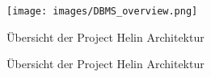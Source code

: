 \begin{tabular}{lll}


\end{tabular}

\begin{figure}[H]
	\centering
	\texttt{[image: images/DBMS\_overview.png]}
	\caption{Übersicht der Project Helin Architektur }
	\label{fig:architecture-overview}
\end{figure}


\begin{figure}[H]
	\centering
	\caption{Übersicht der Project Helin Architektur }
	\label{fig:architecture-overview}
\end{figure}
